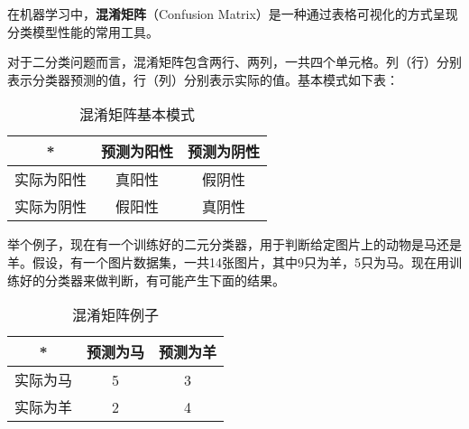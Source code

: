 
在机器学习中，\textbf{混淆矩阵}（Confusion Matrix）是一种通过表格可视化的方式呈现分类模型性能的常用工具。

对于二分类问题而言，混淆矩阵包含两行、两列，一共四个单元格。列（行）分别表示分类器预测的值，行（列）分别表示实际的值。基本模式如下表：
\begin{table}[ht]
\centering
\caption{混淆矩阵基本模式}\label{ConMat_tab1}
\begin{tabular}{|c|c|c|}
\hline
* & 预测为阳性 & 预测为阴性 \\
\hline
实际为阳性 & 真阳性 & 假阴性 \\
\hline
实际为阴性 & 假阳性 & 真阴性 \\
\hline
\end{tabular}
\end{table}
举个例子，现在有一个训练好的二元分类器，用于判断给定图片上的动物是马还是羊。假设，有一个图片数据集，一共14张图片，其中9只为羊，5只为马。现在用训练好的分类器来做判断，有可能产生下面的结果。
\begin{table}[ht]
\centering
\caption{混淆矩阵例子}\label{ConMat_tab2}
\begin{tabular}{|c|c|c|}
\hline
* & 预测为马 & 预测为羊 \\
\hline
实际为马 & 5 & 3 \\
\hline
实际为羊 & 2 & 4 \\
\hline
\end{tabular}
\end{table}